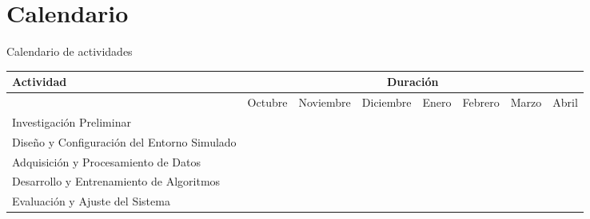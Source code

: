 \documentclass[8pt]{beamer}
\begin{document}
    \section{Calendario}
    \begin{frame}{Calendario de actividades}
        \footnotesize %
        \begin{center}
            \begin{tabular}{|p{2cm}|p{0.1cm}|p{0.1cm}|p{0.1cm}|p{0.1cm}|p{0.1cm}|p{0.1cm}|p{0.1cm}|}
                \hline
                \textbf{Actividad} & \multicolumn{7}{c|}{\textbf{Duración}} \\
                \hline
                & \multicolumn{1}{p{1cm}|}{Octubre} & \multicolumn{1}{p{1cm}|}{Noviembre} & \multicolumn{1}{p{1cm}|}{Diciembre} & \multicolumn{1}{p{1cm}|}{Enero} & \multicolumn{1}{p{1cm}|}{Febrero} & \multicolumn{1}{p{1cm}|}{Marzo} & \multicolumn{1}{p{1cm}|}{Abril} \\
                \hline
                Investigación Preliminar                    & \cellcolor{gray!30}               & \cellcolor{gray!30}                 &                                     &                                 &                                   &                                 &                                 \\
                \hline
                Diseño y Configuración del Entorno Simulado &                                   & \cellcolor{gray!30}                 & \cellcolor{gray!30} & & & & \\
                \hline
                Adquisición y Procesamiento de Datos        &                                   &                                     &                                     & \cellcolor{gray!30}             & \cellcolor{gray!30}               & \cellcolor{gray!30} & \\
                \hline
                Desarrollo y Entrenamiento de Algoritmos    &                                   &                                     &                                     &                                 & \cellcolor{gray!30}               & \cellcolor{gray!30} & \cellcolor{gray!30} \\
                \hline
                Evaluación y Ajuste del Sistema             &                                   &                                     &                                     &                                 &                                   & \cellcolor{gray!30}             & \cellcolor{gray!30}             \\

\end{tabular}
\end{center}
\end{frame}
\end{document}

